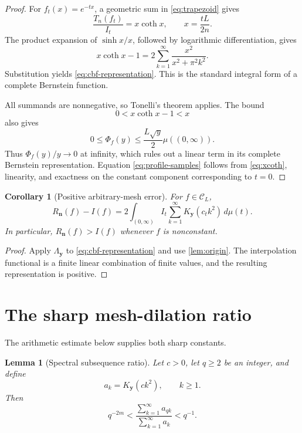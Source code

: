 \documentclass[11pt]{article}
\newtheorem{lemma}[theorem]{Lemma}
\newtheorem{corollary}[theorem]{Corollary}
\theoremstyle{definition}
\theoremstyle{remark}
\newcommand{\cC}{\mathcal{C}}
\newcommand{\bN}{\boldsymbol{n}}
\newcommand{\bY}{\boldsymbol{y}}
\newcommand{\1}{\mathbf{1}}
\begin{document}
\begin{proof}
For \(f_t(x)=e^{-tx}\), a geometric sum in \eqref{eq:trapezoid} gives
\begin{equation}
\frac{T_n(f_t)}{I_t}
=x\coth x,
\qquad
x=\frac{tL}{2n}.
\label{eq:xcoth}
\end{equation}
The product expansion of \(\sinh x/x\), followed by logarithmic
differentiation, gives
\begin{equation}
x\coth x-1
=2\sum_{k=1}^{\infty}
\frac{x^2}{x^2+\pi^2k^2}.
\label{eq:mittag}
\end{equation}
Substitution yields \eqref{eq:cbf-representation}. This is the standard
integral form of a complete Bernstein function.

All summands are nonnegative, so Tonelli's theorem applies. The bound
\[
0<x\coth x-1<x
\]
also gives
\[
0\le\Phi_f(y)
\le \frac{L\sqrt{y}}{2}\mu((0,\infty)).
\]
Thus \(\Phi_f(y)/y\to0\) at infinity, which rules out a linear term in its
complete Bernstein representation. Equation \eqref{eq:profile-samples}
follows from \eqref{eq:xcoth}, linearity, and exactness on the constant
component corresponding to \(t=0\).
\end{proof}

\begin{corollary}[Positive arbitrary-mesh error]
\label{cor:positive-error}
For \(f\in\cC_L\),
\begin{equation}
R_{\bN}(f)-I(f)
=
2\int_{(0,\infty)}
I_t
\sum_{k=1}^{\infty}K_{\bY}(c_tk^2)
\,d\mu(t).
\label{eq:positive-error}
\end{equation}
In particular, \(R_{\bN}(f)>I(f)\) whenever \(f\) is nonconstant.
\end{corollary}

\begin{proof}
Apply \(\Lambda_{\bY}\) to \eqref{eq:cbf-representation} and use
\cref{lem:origin}. The interpolation functional is a finite linear
combination of finite values, and the resulting representation is positive.
\end{proof}

\section{The sharp mesh-dilation ratio}

The arithmetic estimate below supplies both sharp constants.

\begin{lemma}[Spectral subsequence ratio]
\label{lem:spectral}
Let \(c>0\), let \(q\ge2\) be an integer, and define
\[
a_k=K_{\bY}(ck^2),\qquad k\ge1.
\]
Then
\begin{equation}
q^{-2m}
<
\frac{\sum_{k=1}^{\infty}a_{qk}}
     {\sum_{k=1}^{\infty}a_k}
<
q^{-1}.
\label{eq:spectral-ratio}
\end{equation}
\end{lemma}
\end{document}
